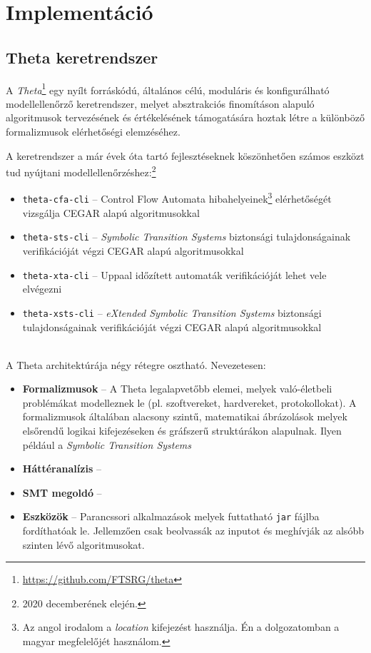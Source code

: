 \chapter{Implementáció}

\section{Theta keretrendszer}
\label{sec:theta_keretrendszer}

A \emph{Theta}\footnote{\url{https://github.com/FTSRG/theta}} egy nyílt forráskódú, általános célú, moduláris és konfigurálható modellellenőrző keretrendszer, melyet absztrakciós finomításon alapuló algoritmusok tervezésének és értékelésének támogatására hoztak létre a különböző formalizmusok elérhetőségi elemzéséhez.

A keretrendszer a már évek óta tartó fejlesztéseknek köszönhetően számos eszközt tud nyújtani modellellenőrzéshez:\footnote{2020 decemberének elején.}

\begin{itemize}
	\item \verb+theta-cfa-cli+ -- Control Flow Automata hibahelyeinek\footnote{Az angol irodalom a \emph{location} kifejezést használja. Én a dolgozatomban a magyar megfelelőjét használom.} elérhetőségét vizsgálja CEGAR alapú algoritmusokkal
	
	\item \verb+theta-sts-cli+ -- \emph{Symbolic Transition Systems} biztonsági tulajdonságainak verifikációját végzi CEGAR alapú algoritmusokkal
	
	\item \verb+theta-xta-cli+ -- Uppaal időzített automaták verifikációját lehet vele elvégezni
	
	\item \verb+theta-xsts-cli+ -- \emph{eXtended Symbolic Transition Systems} biztonsági tulajdonságainak verifikációját végzi CEGAR alapú algoritmusokkal
\end{itemize}
\ \\
A Theta architektúrája négy rétegre osztható. Nevezetesen:

\begin{itemize}
	\item \textbf{Formalizmusok} -- A Theta legalapvetőbb elemei, melyek való-életbeli problémákat modelleznek le (pl. szoftvereket, hardvereket, protokollokat). A formalizmusok általában alacsony szintű, matematikai ábrázolások melyek elsőrendű logikai kifejezéseken és gráfszerű struktúrákon alapulnak. Ilyen például a \emph{Symbolic Transition Systems} 
	
	\item \textbf{Háttéranalízis} -- 
	
	\item \textbf{SMT megoldó} -- 
	
	\item \textbf{Eszközök} -- Parancssori alkalmazások melyek futtatható \verb+jar+ fájlba fordíthatóak le. Jellemzően csak beolvassák az inputot és meghívják az alsóbb szinten lévő algoritmusokat. 
	
\end{itemize}

